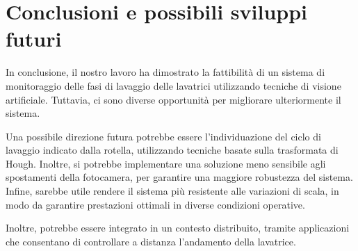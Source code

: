 \documentclass{article}
\begin{document}
\section{Conclusioni e possibili sviluppi
futuri}\label{conclusioni-e-possibili-sviluppi-futuri}

\par In conclusione, il nostro lavoro ha dimostrato la fattibilità di un
sistema di monitoraggio delle fasi di lavaggio delle lavatrici
utilizzando tecniche di visione artificiale. Tuttavia, ci sono diverse
opportunità per migliorare ulteriormente il sistema.

\par Una possibile direzione futura potrebbe essere l'individuazione del
ciclo di lavaggio indicato dalla rotella, utilizzando tecniche basate
sulla trasformata di Hough. Inoltre, si potrebbe implementare una
soluzione meno sensibile agli spostamenti della fotocamera, per
garantire una maggiore robustezza del sistema. Infine, sarebbe utile
rendere il sistema più resistente alle variazioni di scala, in modo da
garantire prestazioni ottimali in diverse condizioni operative.

\par Inoltre, potrebbe essere integrato in un contesto distribuito, tramite
applicazioni che consentano di controllare a distanza l'andamento della
lavatrice.


\end{document}
